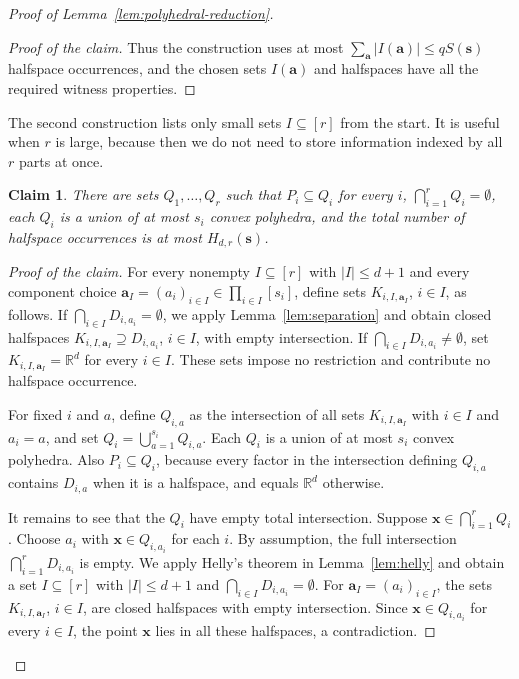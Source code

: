 \documentclass[11pt]{article}
\newtheorem{claim}[theorem]{Claim}
\theoremstyle{definition}
\newenvironment{poc}{\begin{proof}[Proof of the claim]\renewcommand*{\qedsymbol}{\(\blacksquare\)}}{\end{proof}}
\newcommand*{\abs}[1]{\lvert#1\rvert}
\newcommand{\R}{\mathbb{R}}
\begin{document}
\begin{proof}[Proof of Lemma~\ref{lem:polyhedral-reduction}]
\begin{poc}
Thus the construction uses at most \(\sum_{\boldsymbol{a}}\abs{I(\boldsymbol{a})}\le qS(\boldsymbol{s})\) halfspace occurrences, and the chosen sets \(I(\boldsymbol{a})\) and halfspaces have all the required witness properties.
\end{poc}

The second construction lists only small sets \(I\subseteq [r]\) from the start. It is useful when \(r\) is large, because then we do not need to store information indexed by all \(r\) parts at once.

\begin{claim}\label{claim:sparse-construction}
There are sets \(Q_{1},\ldots,Q_{r}\) such that \(P_{i}\subseteq Q_{i}\) for every \(i\), \(\bigcap_{i=1}^{r}Q_{i}=\emptyset\), each \(Q_{i}\) is a union of at most \(s_{i}\) convex polyhedra, and the total number of halfspace occurrences is at most \(H_{d,r}(\boldsymbol{s})\).
\end{claim}
\begin{poc}
For every nonempty \(I\subseteq [r]\) with \(\abs{I}\le d+1\) and every component choice \(\boldsymbol{a}_{I}=(a_{i})_{i\in I}\in\prod_{i\in I}[s_{i}]\), define sets \(K_{i,I,\boldsymbol{a}_{I}}\), \(i\in I\), as follows. If \(\bigcap_{i\in I}D_{i,a_{i}}=\emptyset\), we apply Lemma~\ref{lem:separation} and obtain closed halfspaces \(K_{i,I,\boldsymbol{a}_{I}}\supseteq D_{i,a_{i}}\), \(i\in I\), with empty intersection. If \(\bigcap_{i\in I}D_{i,a_{i}}\ne\emptyset\), set \(K_{i,I,\boldsymbol{a}_{I}}=\R^{d}\) for every \(i\in I\). These sets impose no restriction and contribute no halfspace occurrence.

For fixed \(i\) and \(a\), define \(Q_{i,a}\) as the intersection of all sets \(K_{i,I,\boldsymbol{a}_{I}}\) with \(i\in I\) and \(a_{i}=a\), and set \(Q_{i}=\bigcup_{a=1}^{s_{i}}Q_{i,a}\). Each \(Q_{i}\) is a union of at most \(s_{i}\) convex polyhedra. Also \(P_{i}\subseteq Q_{i}\), because every factor in the intersection defining \(Q_{i,a}\) contains \(D_{i,a}\) when it is a halfspace, and equals \(\R^{d}\) otherwise.

It remains to see that the \(Q_{i}\) have empty total intersection. Suppose \(\boldsymbol{x}\in\bigcap_{i=1}^{r}Q_{i}\). Choose \(a_{i}\) with \(\boldsymbol{x}\in Q_{i,a_{i}}\) for each \(i\). By assumption, the full intersection \(\bigcap_{i=1}^{r}D_{i,a_{i}}\) is empty. We apply Helly's theorem in Lemma~\ref{lem:helly} and obtain a set \(I\subseteq [r]\) with \(\abs{I}\le d+1\) and \(\bigcap_{i\in I}D_{i,a_{i}}=\emptyset\). For \(\boldsymbol{a}_{I}=(a_{i})_{i\in I}\), the sets \(K_{i,I,\boldsymbol{a}_{I}}\), \(i\in I\), are closed halfspaces with empty intersection. Since \(\boldsymbol{x}\in Q_{i,a_{i}}\) for every \(i\in I\), the point \(\boldsymbol{x}\) lies in all these halfspaces, a contradiction.


\end{poc}
\end{proof}
\end{document}
